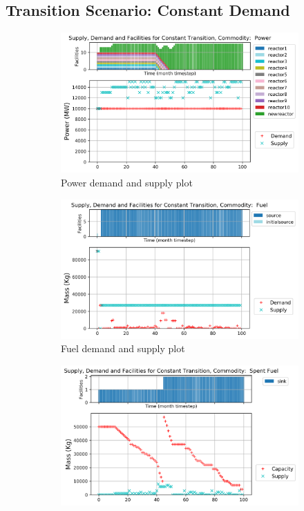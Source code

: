 \documentclass{anstrans}
\begin{document}
\subsection{\textbf{Transition Scenario: Constant Demand}}


\begin{figure}[!htbp]
    \centering
    \begin{subfigure}[t]{\textwidth}
    \centering
        \includegraphics[width=0.8\linewidth]{figures/constanttransition-power.png} 
        \caption{Power demand and supply plot}
        \label{fig:constanttransition-power}
    \end{subfigure}
    \begin{subfigure}[t]{0.65\textwidth}
        \centering
        \includegraphics[width=\linewidth]{figures/constanttransition-fuel.png} 
        \caption{Fuel demand and supply plot}
	    \label{fig:constanttransition-fuel}
    \end{subfigure}
    \begin{subfigure}[t]{0.65\textwidth}
        \centering
        \includegraphics[width=\linewidth]{figures/constanttransition-spentfuel.png} 

\end{subfigure}
\end{figure}
\end{document}
